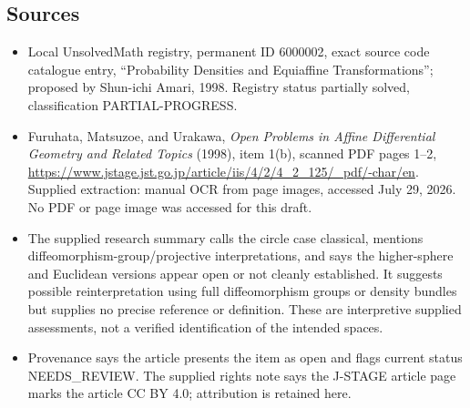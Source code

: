 \documentclass[11pt]{article}
\begin{document}
\subsection{Sources}
\begin{itemize}
\item Local UnsolvedMath registry, permanent ID 6000002, exact source code catalogue entry, ``Probability Densities and Equiaffine Transformations''; proposed by Shun-ichi Amari, 1998. Registry status partially solved, classification PARTIAL-PROGRESS.
\item Furuhata, Matsuzoe, and Urakawa, \emph{Open Problems in Affine Differential Geometry and Related Topics} (1998), item 1(b), scanned PDF pages 1--2, \url{https://www.jstage.jst.go.jp/article/iis/4/2/4_2_125/_pdf/-char/en}. Supplied extraction: manual OCR from page images, accessed July 29, 2026. No PDF or page image was accessed for this draft.
\item The supplied research summary calls the circle case classical, mentions diffeomorphism-group/projective interpretations, and says the higher-sphere and Euclidean versions appear open or not cleanly established. It suggests possible reinterpretation using full diffeomorphism groups or density bundles but supplies no precise reference or definition. These are interpretive supplied assessments, not a verified identification of the intended spaces.
\item Provenance says the article presents the item as open and flags current status NEEDS\_REVIEW. The supplied rights note says the J-STAGE article page marks the article CC BY 4.0; attribution is retained here.
\end{itemize}
\end{document}
